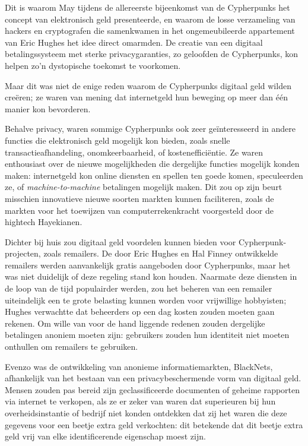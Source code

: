 \documentclass[
  a5paper,
  smalldemyvopaper,11pt,twoside,onecolumn,openright,extrafontsizes,
hidelinks]{memoir}
\begin{document}
Dit is waarom May tijdens de allereerste bijeenkomst van de Cypherpunks
het concept van elektronisch geld presenteerde, en waarom de losse
verzameling van hackers en cryptografen die samenkwamen in het
ongemeubileerde appartement van Eric Hughes het idee direct omarmden. De
creatie van een digitaal betalingssysteem met sterke privacygaranties,
zo geloofden de Cypherpunks, kon helpen zo'n dystopische toekomst te
voorkomen.

Maar dit was niet de enige reden waarom de Cypherpunks digitaal geld
wilden creëren; ze waren van mening dat internetgeld hun beweging op
meer dan één manier kon bevorderen.

Behalve privacy, waren sommige Cypherpunks ook zeer geïnteresseerd in
andere functies die elektronisch geld mogelijk kon bieden, zoals snelle
transactieafhandeling, onomkeerbaarheid, of kostenefficiëntie. Ze waren
enthousiast over de nieuwe mogelijkheden die dergelijke functies
mogelijk konden maken: internetgeld kon online diensten en spellen ten
goede komen, speculeerden ze, of \emph{machine-to-machine} betalingen
mogelijk maken. Dit zou op zijn beurt misschien innovatieve nieuwe
soorten markten kunnen faciliteren, zoals de markten voor het toewijzen
van computerrekenkracht voorgesteld door de hightech Hayekianen.

Dichter bij huis zou digitaal geld voordelen kunnen bieden voor
Cypherpunk-projecten, zoals remailers. De door Eric Hughes en Hal Finney
ontwikkelde remailers werden aanvankelijk gratis aangeboden door
Cypherpunks, maar het was niet duidelijk of deze regeling stand kon
houden. Naarmate deze diensten in de loop van de tijd populairder
werden, zou het beheren van een remailer uiteindelijk een te grote
belasting kunnen worden voor vrijwillige hobbyisten; Hughes verwachtte
dat beheerders op een dag kosten zouden moeten gaan rekenen. Om wille
van voor de hand liggende redenen zouden dergelijke betalingen anoniem
moeten zijn: gebruikers zouden hun identiteit niet moeten onthullen om
remailers te gebruiken.

Evenzo was de ontwikkeling van anonieme informatiemarkten, BlackNets,
afhankelijk van het bestaan van een privacybeschermende vorm van
digitaal geld. Mensen zouden pas bereid zijn geclassificeerde documenten
of geheime rapporten via internet te verkopen, als ze er zeker van waren
dat superieuren bij hun overheidsinstantie of bedrijf niet konden
ontdekken dat zij het waren die deze gegevens voor een beetje extra geld
verkochten: dit betekende dat dit beetje extra geld vrij van elke
identificerende eigenschap moest zijn.
\end{document}
